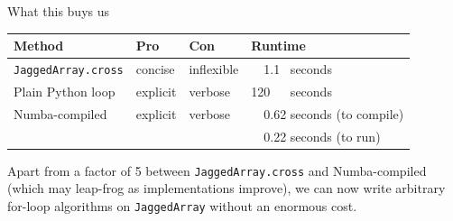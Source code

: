 \documentclass[aspectratio=169]{beamer}
\begin{document}
\begin{frame}{What this buys us}
\large
\vspace{0.5 cm}
\begin{center}
\begin{tabular}{l l l l}
{\bf Method} & {\bf Pro}  & {\bf Con}  & {\bf Runtime} \\\hline
{\tt JaggedArray.cross} & concise  & inflexible & \textcolor{white}{12}1.1\textcolor{white}{2} seconds \\
Plain Python loop       & explicit & verbose    & 120\textcolor{white}{.62} seconds \\
Numba-compiled          & explicit & verbose    & \textcolor{white}{12}0.62 seconds (to compile) \\
                        &          &            & \textcolor{white}{12}0.22 seconds (to run)
\end{tabular}
\end{center}

\vspace{0.25 cm}
Apart from a factor of 5 between {\tt\normalsize JaggedArray.cross} and Numba-compiled (which may leap-frog as implementations improve), we can now write arbitrary for-loop algorithms on {\tt\normalsize JaggedArray} without an enormous cost.
\end{frame}
\end{document}
